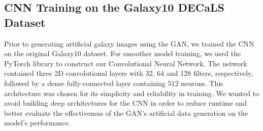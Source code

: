 \documentclass[10pt,twocolumn,letterpaper]{article}
\begin{document}
\subsection{CNN Training on the Galaxy10 DECaLS Dataset}
Prior to generating artificial galaxy images using the GAN, we trained the CNN on the original Galaxy10 dataset.
For smoother model training, we used the PyTorch library to construct our Convolutional Neural Network.
The network contained three 2D convolutional layers with 32, 64 and 128 filters, respectively, followed by a dense fully-connected layer containing 512 neurons.
This architecture was chosen for its simplicity and reliability in training. 
We wanted to avoid building deep architectures for the CNN in order to reduce runtime and better evaluate the effectiveness of the GAN's artificial data generation on the model's performance. 

\end{document}
